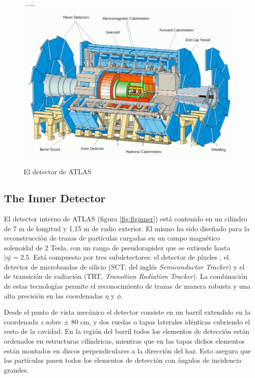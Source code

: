 \begin{figure}[htbp]
  \begin{center}
      \includegraphics[angle=90,width=1\textwidth]{Fig2/TDRchapter1_fig1_ATLAS_DETECTOR.pdf}
    \caption{El detector de ATLAS}
    \label{fig:ATLAS}
  \end{center}
\end{figure}


\subsection{The Inner Detector}\label{sec:atlasID}
El detector interno de ATLAS (figura \ref{fig:figinner}) est\'a contenido en un cilindro de 7 m de longitud y 1,15 m de radio exterior. El mismo ha sido dise\~nado para la reconstrucci\'on de trazas de part\'iculas cargadas en un campo magn\'etico solenoidal de 2 Tesla, con un rango de pseudorapidez que se extiende hasta $|\eta|=  2.5$. Est\'a compuesto por tres subdetectores: el  detector de p\'ixeles , el detector de microbandas de silicio (SCT, del ingl\'es \emph{Semiconductor Tracker}) y el de transici\'on de radiaci\'on (TRT, \emph{Transition Radiation Tracker}).  La combinaci\'on de estas tecnolog\'ias permite el reconocimiento de trazas de manera robusta y una alta precisi\'on en las coordenadas $\eta$ y $\phi$.  

   Desde el punto de vista mec\'anico el detector consiste en un barril extendido en la coordenada \emph{z} sobre $\pm$ 80 cm, y dos ruedas o tapas laterales id\'enticas cubriendo el resto de la cavidad. En la regi\'on del barril todos los elementos de detecci\'on est\'an ordenados en estructuras cil\'indricas, mientras que en las tapas dichos elementos est\'an montados en discos perpendiculares a la direcci\'on del haz. Esto asegura que las part\'iculas pasen todos los elementos de detecci\'on con \'angulos de incidencia grandes.

